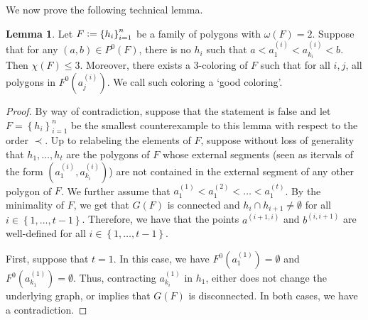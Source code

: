 \documentclass[12pt]{article}
\theoremstyle{definition}
\newtheorem{lemma}[thm]{Lemma}
\newcommand{\defeq}{\vcentcolon=}
\begin{document}
     We now prove the following
     technical lemma.

     \begin{lemma}
         Let $F \defeq \left\{h_{i}\right\}_{i =1}^{n}$ 
         be a family of polygons with
         $\omega\left(F\right) = 2$.
         Suppose that for any
         $\left(a, b\right) \in P^{0}\left(F\right)$,
         there is no $h_{i}$ such
         that $a < a_1^{\left(i\right)}
         < a_{k_{i}}^{\left(i\right)} < b$.
         Then $\chi\left(F\right) \leq 3$.
         Moreover, there exists
         a 3-coloring of $F$ such
         that for all $i, j$,
         all polygons in
         $F^{0}\left(a_{j}^{\left(i\right)}\right)$.
         We call such coloring a
         `good coloring'.
     \end{lemma}

     \begin{proof}
         By way of contradiction,
         suppose that the statement is
         false and let
         $F = \left\{h_{i}\right\}_{i = 1}^{n}$ 
         be the smallest counterexample
         to this lemma with respect
         to the order $\prec$.
         Up to relabeling the elements
         of $F$, suppose without loss
         of generality that
         $h_{1}, \ldots, h_{t}$ are
         the polygons of $F$ whose
         external segments (seen as itervals
         of the form
         $\left(a_1^{\left(i\right)}, a_{k_{i}}^{\left(i\right)}\right)$) 
         are not contained
         in the external segment of 
         any other polygon of $F$.
         We further assume that
         $a_1^{\left(1\right)} <
         a_1^{\left(2\right)} < \ldots < 
         a_1^{\left(t\right)}$.
         By the minimality of $F$, we get
         that $G\left(F\right)$ is
         connected and $h_{i} \cap h_{i+1} \neq \emptyset$
         for all $i \in \left\{1, \ldots, t-1\right\}$.
         Therefore, we have that the points
         $a^{\left(i+1, i\right)}$ and
         $b^{\left(i, i+1\right)}$ are
         well-defined for all 
         $i \in \left\{1, \ldots, t-1\right\}$.

         First, suppose that $t = 1$.
         In this case, we have $F^{0}\left(a_1^{\left(1\right)}\right)
         = \emptyset$ and
         $F^{0}\left(a_{k_1}^{\left(1\right)}\right) = \emptyset$.
         Thus, contracting
         $a_{k_{i}}^{\left(1\right)}$ in $h_1$,
         either does not change the underlying graph,
         or implies that $G\left(F\right)$ is
         disconnected. In both cases, we have a contradiction.


\end{proof}
\end{document}
